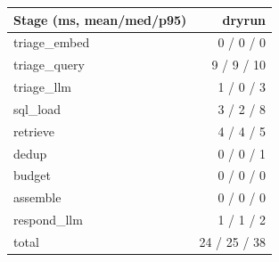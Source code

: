 \begin{tabular}{lr}
\toprule
Stage (ms, mean/med/p95) & dryrun \\
\midrule
triage\_embed & 0 / 0 / 0 \\
triage\_query & 9 / 9 / 10 \\
triage\_llm & 1 / 0 / 3 \\
sql\_load & 3 / 2 / 8 \\
retrieve & 4 / 4 / 5 \\
dedup & 0 / 0 / 1 \\
budget & 0 / 0 / 0 \\
assemble & 0 / 0 / 0 \\
respond\_llm & 1 / 1 / 2 \\
total & 24 / 25 / 38 \\
\bottomrule
\end{tabular}
